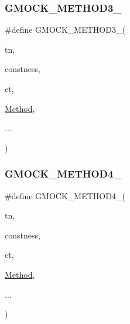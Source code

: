 \mbox{\label{_obj__test_2lib_2googletest-master_2googlemock_2include_2gmock_2gmock-generated-function-mockers_8h_af7c77ba511c631de02bb8c45a6ed3045}} 
\subsubsection{\texorpdfstring{GMOCK\_METHOD3\_}{GMOCK\_METHOD3\_}}
{\footnotesize\ttfamily \#define G\+M\+O\+C\+K\+\_\+\+M\+E\+T\+H\+O\+D3\+\_\+(\begin{DoxyParamCaption}\item[{}]{tn,  }\item[{}]{constness,  }\item[{}]{ct,  }\item[{}]{\mbox{\hyperlink{_obj__test_2lib_2googletest-release-1_88_81_2googlemock_2test_2gmock-spec-builders__test_8cc_a95606368148f3e5aab5db46c32466afd}{Method}},  }\item[{}]{... }\end{DoxyParamCaption})}

\mbox{\label{_obj__test_2lib_2googletest-master_2googlemock_2include_2gmock_2gmock-generated-function-mockers_8h_ab6430f2cfad9de4aca5258ea559294bb}} 
\subsubsection{\texorpdfstring{GMOCK\_METHOD4\_}{GMOCK\_METHOD4\_}}
{\footnotesize\ttfamily \#define G\+M\+O\+C\+K\+\_\+\+M\+E\+T\+H\+O\+D4\+\_\+(\begin{DoxyParamCaption}\item[{}]{tn,  }\item[{}]{constness,  }\item[{}]{ct,  }\item[{}]{\mbox{\hyperlink{_obj__test_2lib_2googletest-release-1_88_81_2googlemock_2test_2gmock-spec-builders__test_8cc_a95606368148f3e5aab5db46c32466afd}{Method}},  }\item[{}]{... }\end{DoxyParamCaption})}

